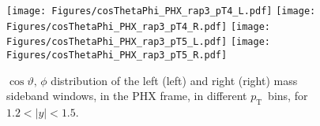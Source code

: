 \documentclass[12pt]{article}
\newcommand{\pt}{$p_{\mathrm{T}}$}
\begin{document}
\begin{figure}[htbp]
\centering
\texttt{[image: Figures/cosThetaPhi\_PHX\_rap3\_pT4\_L.pdf]}
\texttt{[image: Figures/cosThetaPhi\_PHX\_rap3\_pT4\_R.pdf]}
\texttt{[image: Figures/cosThetaPhi\_PHX\_rap3\_pT5\_L.pdf]}
\texttt{[image: Figures/cosThetaPhi\_PHX\_rap3\_pT5\_R.pdf]}
\caption{$\cos\vartheta,\,\phi$ distribution of the left (left) and
  right (right) mass sideband windows, in the PHX frame, in different
  \pt\ bins, for $1.2 < |y| < 1.5$.} 
\end{figure}
\clearpage
\end{document}
